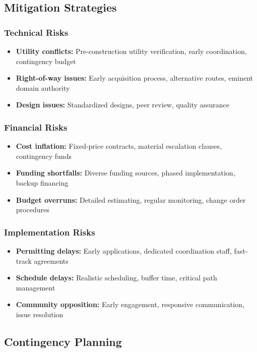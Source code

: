 \documentclass[11pt,letterpaper]{article}
\begin{document}
\subsection{Mitigation Strategies}

\subsubsection{Technical Risks}
\begin{itemize}
    \item \textbf{Utility conflicts:} Pre-construction utility verification, early coordination, contingency budget
    \item \textbf{Right-of-way issues:} Early acquisition process, alternative routes, eminent domain authority
    \item \textbf{Design issues:} Standardized designs, peer review, quality assurance
\end{itemize}

\subsubsection{Financial Risks}
\begin{itemize}
    \item \textbf{Cost inflation:} Fixed-price contracts, material escalation clauses, contingency funds
    \item \textbf{Funding shortfalls:} Diverse funding sources, phased implementation, backup financing
    \item \textbf{Budget overruns:} Detailed estimating, regular monitoring, change order procedures
\end{itemize}

\subsubsection{Implementation Risks}
\begin{itemize}
    \item \textbf{Permitting delays:} Early applications, dedicated coordination staff, fast-track agreements
    \item \textbf{Schedule delays:} Realistic scheduling, buffer time, critical path management
    \item \textbf{Community opposition:} Early engagement, responsive communication, issue resolution
\end{itemize}

\subsection{Contingency Planning}
\end{document}
